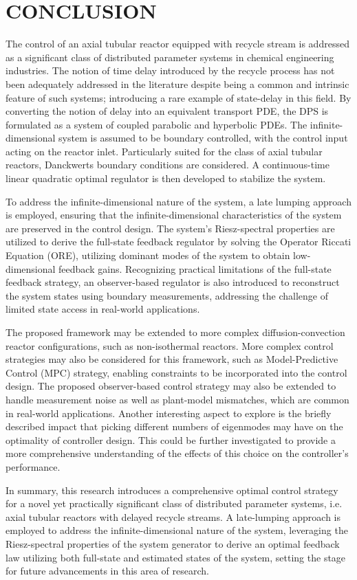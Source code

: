 \section{CONCLUSION}

The control of an axial tubular reactor equipped with recycle stream is addressed as a significant class of distributed parameter systems in chemical engineering industries. The notion of time delay introduced by the recycle process has not been adequately addressed in the literature despite being a common and intrinsic feature of such systems; introducing a rare example of state-delay in this field. By converting the notion of delay into an equivalent transport PDE, the DPS is formulated as a system of coupled parabolic and hyperbolic PDEs. The infinite-dimensional system is assumed to be boundary controlled, with the control input acting on the reactor inlet. Particularly suited for the class of axial tubular reactors, Danckwerts boundary conditions are considered. A continuous-time linear quadratic optimal regulator is then developed to stabilize the system.

To address the infinite-dimensional nature of the system, a late lumping approach is employed, ensuring that the infinite-dimensional characteristics of the system are preserved in the control design. The system's Riesz-spectral properties are utilized to derive the full-state feedback regulator by solving the Operator Riccati Equation (ORE), utilizing dominant modes of the system to obtain low-dimensional feedback gains. Recognizing practical limitations of the full-state feedback strategy, an observer-based regulator is also introduced to reconstruct the system states using boundary measurements, addressing the challenge of limited state access in real-world applications.

The proposed framework may be extended to more complex diffusion-convection reactor configurations, such as non-isothermal reactors. More complex control strategies may also be considered for this framework, such as Model-Predictive Control (MPC) strategy, enabling constraints to be incorporated into the control design. The proposed observer-based control strategy may also be extended to handle measurement noise as well as plant-model mismatches, which are common in real-world applications. Another interesting aspect to explore is the briefly described impact that picking different numbers of eigenmodes may have on the optimality of controller design. This could be further investigated to provide a more comprehensive understanding of the effects of this choice on the controller's performance.

In summary, this research introduces a comprehensive optimal control strategy for a novel yet practically significant class of distributed parameter systems, i.e. axial tubular reactors with delayed recycle streams. A late-lumping approach is employed to address the infinite-dimensional nature of the system, leveraging the Riesz-spectral properties of the system generator to derive an optimal feedback law utilizing both full-state and estimated states of the system, setting the stage for future advancements in this area of research.